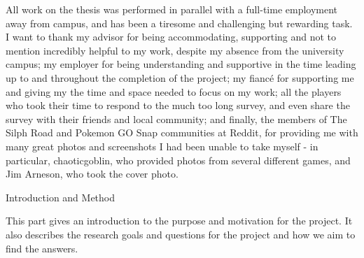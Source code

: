 \documentclass[12pt, oneside]{Thesis} %
\makeatletter
\let\LaTeXStandardPart\part%
\newcommand{\unstarredpart@@noopt}[1]{%
	\unstarredpart@@opt[#1]{#1}%
}%
\newcommand{\unstarredpart@@opt}[2][]{%
	\cleardoublepage%
	\begingroup%
	\let\newpage\relax%
	\LaTeXStandardPart[#1]{#2}%
	\endgroup%
}%
\newcommand{\starredpart}[1]{%
	\LaTeXStandardPart*{#1}%
}%
\newcommand{\unstarredpart}{%
	\@ifnextchar[{\unstarredpart@@opt}{\unstarredpart@@noopt}%
}%
\renewcommand{\part}{%
	\@ifstar{\starredpart}{\unstarredpart}%
}%
\makeatother
\begin{document}
{\begin{center}
	All work on the thesis was performed in parallel with a full-time employment away from campus, and has been a tiresome and challenging but rewarding task. I want to thank my advisor for being accommodating, supporting and not to mention incredibly helpful to my work, despite my absence from the university campus; my employer for being understanding and supportive in the time leading up to and throughout the completion of the project; my fiancé for supporting me and giving my the time and space needed to focus on my work; all the players who took their time to respond to the much too long survey, and even share the survey with their friends and local community; and finally, the members of The Silph Road and Pokemon GO Snap communities at Reddit, for providing me with many great photos and screenshots I had been unable to take myself - in particular, chaoticgoblin, who provided photos from several different games, and Jim Arneson, who took the cover photo.
\end{center}
\clearpage %


\pagestyle{fancy} %

\setcounter{tocdepth}{2}
\tableofcontents %
\listoftables
\listoffigures


\mainmatter %

\pagestyle{fancy} %


\part{Introduction and Method}
\begin{center}
	This part gives an introduction to the purpose and motivation for the project. It also describes the research goals and questions for the project and how we aim to find the answers.
\end{center}

}
\end{document}

